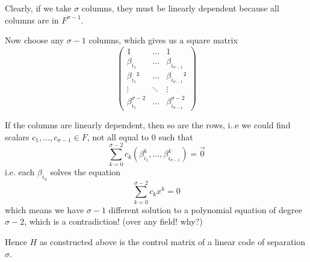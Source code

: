 \documentclass[english]{lbscript}
\begin{document}
Clearly, if we take \(𝜎\) columns, they must be linearly dependent because all columns are in \(F^{𝜎-1}\).

Now choose any \(𝜎-1\) columns, which gives us a square matrix
\begin{equation}
	\label{eq:155}
	\begin{pmatrix}
		1             & \dots  & 1                 \\
		𝛽_{i_1}       & \dots  & 𝛽_{i_{𝜎-1}}       \\
		𝛽_{i_1}²      & \dots  & 𝛽_{i_{𝜎-1}}²      \\
		\vdots        & \ddots & \vdots            \\
		𝛽_{i_1}^{𝜎-2} & \dots  & 𝛽_{i_{𝜎-1}}^{𝜎-2}
	\end{pmatrix}
\end{equation}

If the columns are linearly dependent, then so are the rows, i..e we could find scalars \(c_1, \dots, c_{𝜎-1}∈F\), not all equal to \(0\) such that
\begin{equation}
	\label{eq:156}
	∑_{k=0}^{𝜎-2} c_k (𝛽_{i_1}^{k}, \dots, 𝛽_{i_{𝜎-1}}^{k}) = \vec{0}
\end{equation}
i.e. each \(𝛽_{i_{n}}\) solves the equation
\begin{equation}
	\label{eq:157}
	∑_{k=0}^{𝜎-2} c_{k} x^{k} = 0
\end{equation}
which means we have \(𝜎-1\) different solution to a polynomial equation of degree \(𝜎-2\), which is a contradiction! (over any field! why?)

Hence \(H\) as constructed above is the control matrix of a linear code of separation \(𝜎\).
\end{document}
